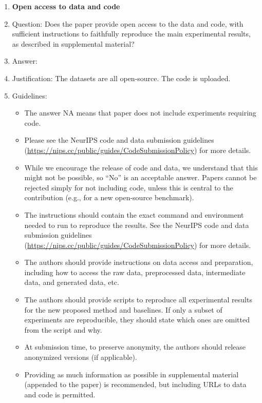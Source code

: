 \documentclass{article}
\theoremstyle{plain}
\theoremstyle{definition}
\theoremstyle{remark}
\begin{document}
\begin{enumerate}
\item {\bf Open access to data and code}
    \item[] Question: Does the paper provide open access to the data and code, with sufficient instructions to faithfully reproduce the main experimental results, as described in supplemental material?
    \item[] Answer: \answerYes{} %
    \item[] Justification: The datasets are all open-source. The code is uploaded.
    \item[] Guidelines:
    \begin{itemize}
        \item The answer NA means that paper does not include experiments requiring code.
        \item Please see the NeurIPS code and data submission guidelines (\url{https://nips.cc/public/guides/CodeSubmissionPolicy}) for more details.
        \item While we encourage the release of code and data, we understand that this might not be possible, so “No” is an acceptable answer. Papers cannot be rejected simply for not including code, unless this is central to the contribution (e.g., for a new open-source benchmark).
        \item The instructions should contain the exact command and environment needed to run to reproduce the results. See the NeurIPS code and data submission guidelines (\url{https://nips.cc/public/guides/CodeSubmissionPolicy}) for more details.
        \item The authors should provide instructions on data access and preparation, including how to access the raw data, preprocessed data, intermediate data, and generated data, etc.
        \item The authors should provide scripts to reproduce all experimental results for the new proposed method and baselines. If only a subset of experiments are reproducible, they should state which ones are omitted from the script and why.
        \item At submission time, to preserve anonymity, the authors should release anonymized versions (if applicable).
        \item Providing as much information as possible in supplemental material (appended to the paper) is recommended, but including URLs to data and code is permitted.
    \end{itemize}



\end{enumerate}
\end{document}
